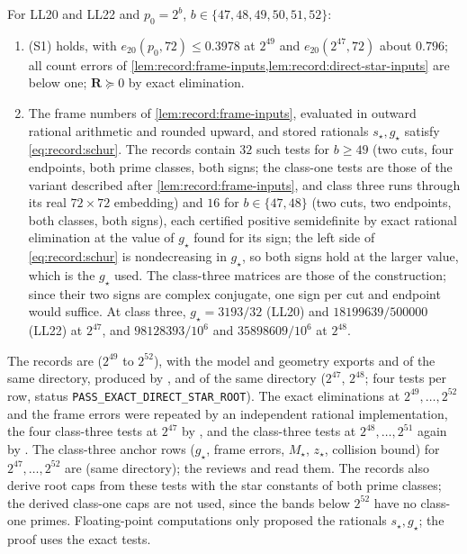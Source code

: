 \begin{certificate}\label{cert:record:direct-star}
For LL20 and LL22 and $p_0=2^b$, $b\in\{47,48,49,50,51,52\}$:
\begin{enumerate}[label=(\alph*)]
\item (S1) holds, with $e_{20}(p_0,72)\le0.3978$ at $2^{49}$ and $e_{20}(2^{47},72)$
 about $0.796$; all count errors of
 \cref{lem:record:frame-inputs,lem:record:direct-star-inputs} are below one;
 $\mathbf R\succeq0$ by exact elimination.
\item The frame numbers of \cref{lem:record:frame-inputs}, evaluated in outward
 rational arithmetic and rounded upward, and stored rationals $s_\star,g_\star$
 satisfy \eqref{eq:record:schur}. The records contain $32$ such tests for
 $b\ge49$ (two cuts, four endpoints, both prime classes, both signs; the class-one
 tests are those of the variant described after \cref{lem:record:frame-inputs},
 and class three runs through its real $72\times72$ embedding) and $16$ for
 $b\in\{47,48\}$ (two cuts, two endpoints, both classes, both signs), each
 certified positive semidefinite by exact rational elimination at the value of
 $g_\star$ found for its sign; the left side of \eqref{eq:record:schur} is
 nondecreasing in $g_\star$, so both signs hold at the larger value, which is the
 $g_\star$ used. The class-three matrices are those of the construction; since
 their two signs are complex conjugate, one sign per cut and endpoint would
 suffice. At class three, $g_\star=3193/32$ (LL20) and $18199639/500000$ (LL22) at
 $2^{47}$, and $98128393/10^6$ and $35898609/10^6$ at $2^{48}$.
\end{enumerate}
The records are 
($2^{49}$ to $2^{52}$), with the model and geometry exports
 and 
of the same directory, produced by , and
 of the same directory ($2^{47}$, $2^{48}$;
four tests per row, status \texttt{PASS\_EXACT\_DIRECT\_STAR\_ROOT}). The exact
eliminations at $2^{49},\dots,2^{52}$ and the frame errors were repeated by an
independent rational implementation, the four class-three tests at $2^{47}$
by , and the
class-three tests at $2^{48},\dots,2^{51}$ again by
. The
class-three anchor rows ($g_\star$, frame errors, $M_\star$, $z_\star$, collision
bound) for $2^{47},\dots,2^{52}$ are  (same
directory); the reviews 
and  read
them. The records also derive root caps from these tests with the star constants
of both prime classes; the derived class-one caps are not used, since the
bands below $2^{52}$ have no
class-one primes. Floating-point computations only proposed the rationals
$s_\star,g_\star$; the proof uses the exact tests.
\end{certificate}

